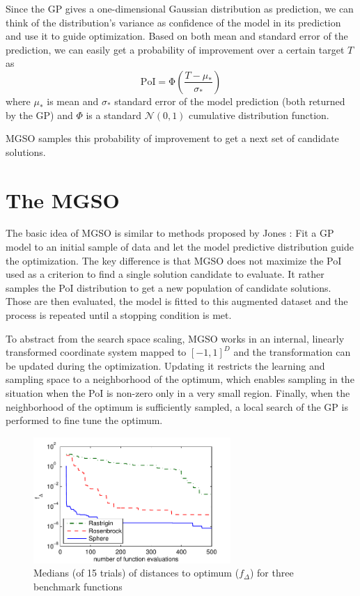 \documentclass{sig-alternate}
\begin{document}
Since the GP gives a one-dimensional Gaussian distribution as prediction, we can think of the distribution's variance
as confidence of the model in its prediction and use it to guide optimization. Based on both mean 
and standard error of the prediction, we can easily get a probability of improvement \cite{jones01taxonomy} over a 
certain target $T$ as
$$
 \mathrm{PoI} = \mathrm{\Phi}\left( \frac{T - \mu_*}{\sigma_*} \right)
$$
where $\mu_*$ is mean and $\sigma_*$ standard error of the model prediction (both returned by the GP) and $\Phi$ is a standard $\mathcal{N}(0,1)$ cumulative distribution function.

MGSO samples this probability of improvement to get a next set of candidate solutions.

\section{The MGSO}

The basic idea of MGSO is similar to methods proposed by Jones \cite{jones01taxonomy}: Fit a 
GP model to an initial sample of data and let the model predictive distribution guide the optimization. 
The key difference is that MGSO does not maximize the PoI used as a criterion to find a single
solution candidate to evaluate. It rather samples the PoI distribution to get a new population of
candidate solutions. Those are then evaluated, the model is fitted to this augmented 
dataset and the process is repeated until a stopping condition is met.

To abstract from the search space scaling, MGSO works in an internal, linearly transformed coordinate system 
mapped to $[-1, 1]^D$ and the transformation can be updated during the optimization. Updating it restricts the 
learning and sampling space to a neighborhood of the optimum, which enables sampling in the situation when 
the PoI is non-zero only in a very small region. Finally, when the neighborhood of the optimum is 
sufficiently sampled, a local search of the GP is performed to fine tune the optimum. 

\begin{figure}
  \centering
  \includegraphics[width=7.5cm]{mgso_3func_2D}

  \caption{
    Medians (of 15 trials) of distances to optimum ($f_{\Delta}$) 
    for three benchmark functions}
  \label{fig:test}
\end{figure}
\end{document}
